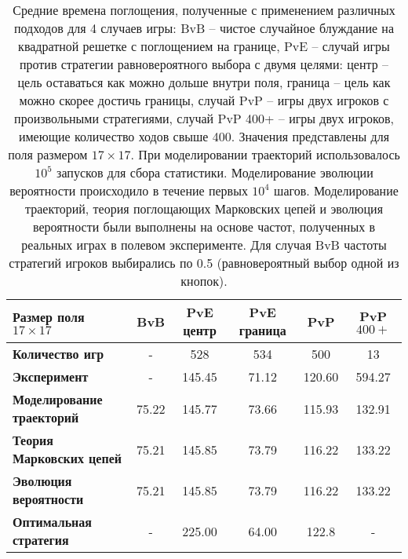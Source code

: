 \begin{table}
\begin{tabular}{|l|c|c|c|c|c|}
        \toprule
        Размер поля $17 \times 17$ & \textbf{BvB} & \textbf{PvE центр} & \textbf{PvE граница} & \textbf{PvP} & \textbf{PvP $400+$} \\ 
        \midrule
        \textbf{Количество игр} & -     & 528    & 534   & 500    & 13     \\ 
        \midrule
        \textbf{Эксперимент}  & -     & 145.45 & 71.12 & 120.60 & 594.27 \\ 
        \textbf{Моделирование траекторий}  & 75.22 & 145.77 & 73.66 & 115.93 & 132.91 \\
        \textbf{Теория Марковских цепей}  & 75.21 & 145.85 & 73.79 & 116.22 & 133.22 \\
        \textbf{Эволюция вероятности}   & 75.21 & 145.85 & 73.79 & 116.22 & 133.22 \\ 
        \textbf{Оптимальная стратегия}     & -     & 225.00 & 64.00 & 122.8  & -      \\ 
        \bottomrule
    \end{tabular}
    \caption{
        Средние времена поглощения, полученные с применением различных подходов для 4 случаев игры: BvB -- чистое случайное блуждание на квадратной решетке с поглощением на границе, PvE -- случай игры против стратегии равновероятного выбора с двумя целями: центр -- цель оставаться как можно дольше внутри поля, граница -- цель как можно скорее достичь границы, случай PvP -- игры двух игроков с произвольными стратегиями, случай PvP 400+ -- игры двух игроков, имеющие количество ходов свыше 400. Значения представлены для поля размером $17 \times 17$. При моделировании траекторий использовалось $10^5$ запусков для сбора статистики. Моделирование эволюции вероятности происходило в течение первых $10^4$ шагов. Моделирование траекторий, теория поглощающих Марковских цепей и эволюция вероятности были выполнены на основе частот, полученных в реальных играх в полевом эксперименте. Для случая BvB частоты стратегий игроков выбирались по 0.5 (равновероятный выбор одной из кнопок).
    }
    \label{tab:time}
\end{table}

